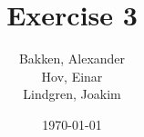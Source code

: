 \newcommand{\mytitle}{Exercise 3}
\newcommand{\mygroupnumber}{5}
\newcommand{\myauthor}{Bakken, Alexander\\Hov, Einar\\Lindgren, Joakim}

\title{\mytitle}
\author{\myauthor}
\date{\today}
